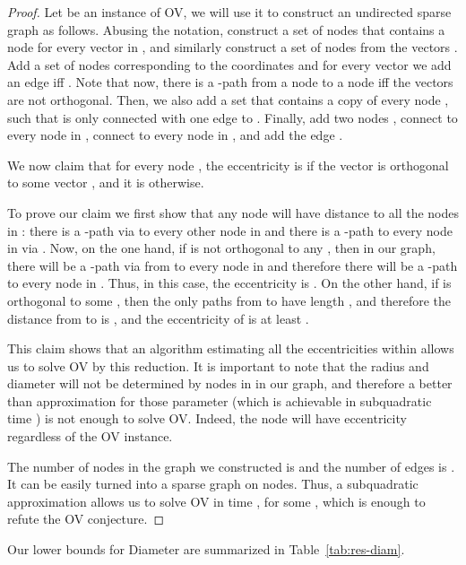\begin{proof}
Let  be an instance of OV, we will use it to construct an undirected sparse graph  as follows.
Abusing the notation, construct a set of nodes  that contains a node  for every vector in , and similarly construct a set of nodes  from the vectors .
Add a set of nodes  corresponding to the coordinates  and for every vector  we add an edge  iff .
Note that now, there is a -path from a node  to a node  iff the vectors  are not orthogonal.
Then, we also add a set  that contains a copy  of every node , such that  is only connected with one edge to .
Finally, add two nodes , connect  to every node in , connect  to every node in , and add the edge .

We now claim that for every node , the eccentricity is  if the vector  is orthogonal to some vector , and it is  otherwise.

To prove our claim we first show that any node  will have distance  to all the nodes in :
there is a -path via  to every other node in  and there is a -path to every node in  via .
Now, on the one hand, if  is not orthogonal to any , then in our graph, there will be a -path via  from  to every node in  and therefore there will be a -path to every node in .
Thus, in this case, the eccentricity is .
On the other hand, if  is orthogonal to some , then the only paths from  to  have length , and therefore the distance from  to  is , and the eccentricity of  is at least .

This claim shows that an algorithm estimating all the eccentricities within  allows us to solve OV by this reduction.
It is important to note that the radius and diameter will not be determined by nodes in  in our graph, and therefore a better than  approximation for those parameter (which is achievable in subquadratic time \cite{RV13}) is not enough to solve OV.
Indeed, the node  will have eccentricity  regardless of the OV instance.

The number of nodes in the graph we constructed is  and the number of edges is .
It can be easily turned into a sparse graph on  nodes.
Thus, a subquadratic  approximation allows us to solve OV in time , for some , which is enough to refute the OV conjecture.

\end{proof}


Our lower bounds for Diameter are summarized in Table~\ref{tab:res-diam}.

